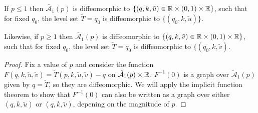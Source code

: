 \begin{lem}
\label{lem:T_graph}
If $p \leq 1$ then $\tilde{\mathcal{A}_1}(p)$ is diffeomorphic to $\{(q,k,\tilde{u}) \in \mathbb{R}\times(0,1)\times\mathbb{R} \}$, such that for fixed $q_0$, the level set $\tilde{T} = q_0$ is diffeomorphic to $\{(q_0,k,\tilde{u}) \}$.

Likewise, if $p \geq 1$ then $\tilde{\mathcal{A}_1}(p)$ is diffeomorphic to $\{(q,k,\tilde{v}) \in \mathbb{R}\times(0,1)\times\mathbb{R} \}$, such that for fixed $q_0$, the level set $\tilde{T} = q_0$ is diffeomorphic to $\{(q_0,k,\tilde{v})$.

\begin{proof}
Fix a value of $p$ and consider the function $F(q, k,\tilde{u},\tilde{v}) = \tilde{T}(p,k,\tilde{u},\tilde{v}) - q$ on $\mathcal{\tilde{A}}_1(p)\times\mathbb{R}$. $F^{-1}(0)$ is a graph over $\mathcal{\tilde{A}}_1(p)$ given by $q=\tilde{T}$, so they are diffeomorphic. We will apply the implicit function theorem to show that $F^{-1}(0)$ can also be written as a graph over either $(q,k,\tilde{u})$ or $(q,k,\tilde{v})$, depening on the magnitude of $p$.


\end{proof}
\end{lem}
